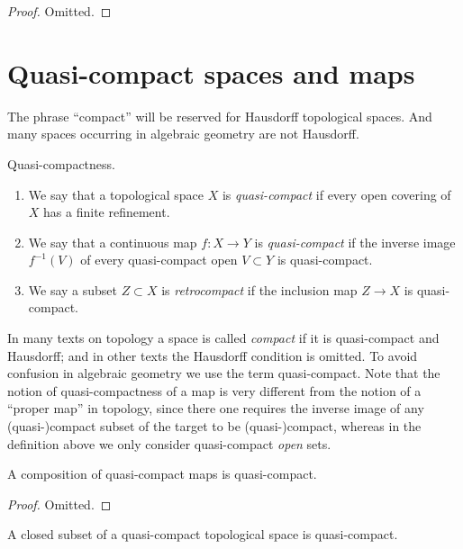 \begin{proof}
Omitted.
\end{proof}







\section{Quasi-compact spaces and maps}
\label{section-quasi-compact}

\noindent
The phrase ``compact'' will be reserved
for Hausdorff topological spaces. And many spaces occurring
in algebraic geometry are not Hausdorff.

\begin{definition}
\label{definition-quasi-compact}
Quasi-compactness.
\begin{enumerate}
\item We say that a topological space $X$ is {\it quasi-compact}
if every open covering of $X$ has a finite refinement.
\item We say that a continuous map $f : X \to Y$ is {\it quasi-compact}
if the inverse image $f^{-1}(V)$ of every quasi-compact open $V \subset Y$
is quasi-compact.
\item We say a subset $Z \subset X$ is {\it retrocompact}
if the inclusion map $Z \to X$ is quasi-compact.
\end{enumerate}
\end{definition}

\noindent
In many texts on topology a space is called {\it compact} if it
is quasi-compact and Hausdorff; and in other texts the Hausdorff
condition is omitted. To avoid confusion in algebraic geometry
we use the term quasi-compact. Note that the notion of quasi-compactness
of a map is very different from the notion of a ``proper map''
in topology, since there one requires the inverse image of any
(quasi-)compact subset of the target to be (quasi-)compact,
whereas in the definition above we only consider quasi-compact
{\it open} sets.

\begin{lemma}
\label{lemma-composition-quasi-compact}
A composition of quasi-compact maps is quasi-compact.
\end{lemma}

\begin{proof}
Omitted.
\end{proof}

\begin{lemma}
\label{lemma-closed-in-quasi-compact}
A closed subset of a quasi-compact topological space is quasi-compact.
\end{lemma}

